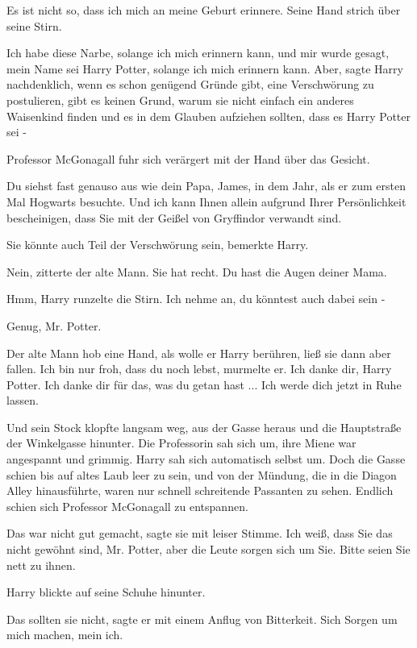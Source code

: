 \glqq{}Es ist nicht so, dass ich mich an meine Geburt erinnere.\grqq{} Seine Hand
strich über seine Stirn.

\glqq{}Ich habe diese Narbe, solange ich mich erinnern kann, und mir wurde
gesagt, mein Name sei Harry Potter, solange ich mich erinnern kann. Aber\grqq{},
sagte Harry nachdenklich, \glqq{}wenn es schon genügend Gründe gibt, eine
Verschwörung zu postulieren, gibt es keinen Grund, warum sie nicht einfach ein
anderes Waisenkind finden und es in dem Glauben aufziehen sollten, dass es Harry
Potter sei -\grqq{}

Professor McGonagall fuhr sich verärgert mit der Hand über das Gesicht.

\glqq{}Du siehst fast genauso aus wie dein Papa, James, in dem Jahr, als er zum
ersten Mal Hogwarts besuchte. Und ich kann Ihnen allein aufgrund Ihrer
Persönlichkeit bescheinigen, dass Sie mit der Geißel von Gryffindor verwandt
sind.\grqq{}

\glqq{}Sie könnte auch Teil der Verschwörung sein\grqq{}, bemerkte Harry.

\glqq{}Nein\grqq{}, zitterte der alte Mann. \glqq{}Sie hat recht. Du hast die
Augen deiner Mama.\grqq{}

\glqq{}Hmm\grqq{}, Harry runzelte die Stirn. \glqq{}Ich nehme an, du könntest auch
dabei sein -\grqq{}

\glqq{}Genug, Mr. Potter.\grqq{}

Der alte Mann hob eine Hand, als wolle er Harry berühren, ließ sie dann aber
fallen. \glqq{}Ich bin nur froh, dass du noch lebst\grqq{}, murmelte er. \glqq{}
Ich danke dir, Harry Potter. Ich danke dir für das, was du getan hast ... Ich
werde dich jetzt in Ruhe lassen.\grqq{}

Und sein Stock klopfte langsam weg, aus der Gasse heraus und die Hauptstraße der
Winkelgasse hinunter. Die Professorin sah sich um, ihre Miene war angespannt und
grimmig. Harry sah sich automatisch selbst um. Doch die Gasse schien bis auf
altes Laub leer zu sein, und von der Mündung, die in die Diagon Alley
hinausführte, waren nur schnell schreitende Passanten zu sehen. Endlich schien
sich Professor McGonagall zu entspannen.

\glqq{}Das war nicht gut gemacht\grqq{}, sagte sie mit leiser Stimme. \glqq{}Ich
weiß, dass Sie das nicht gewöhnt sind, Mr. Potter, aber die Leute sorgen sich um
Sie. Bitte seien Sie nett zu ihnen.\grqq{}

Harry blickte auf seine Schuhe hinunter.

\glqq{}Das sollten sie nicht\grqq{}, sagte er mit einem Anflug von Bitterkeit.
\glqq{}Sich Sorgen um mich machen, mein ich.\grqq{}

